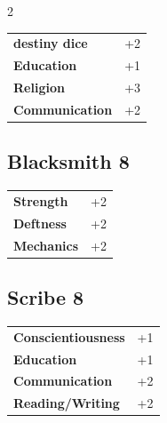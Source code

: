 \begin{multicols}{2}
\begin{tcolorbox}
\vspace{3mm}

\begin{tabular}{@{}ll@{}}
    \textbf{destiny dice} & +2\\
    \textbf{Education} & +1\\
    \textbf{Religion} & +3\\
    \textbf{Communication} & +2\\
\end{tabular}


\end{tcolorbox}

\begin{tcolorbox}
    \subsection*{Blacksmith \hfill \small{8 }}
    \tcblower




\begin{tabular}{@{}ll@{}}
    \textbf{Strength} & +2\\
    \textbf{Deftness} & +2\\
    \textbf{Mechanics} & +2\\
\end{tabular}


\end{tcolorbox}

\begin{tcolorbox}
    \subsection*{Scribe \hfill \small{8 }}
    \tcblower




\begin{tabular}{@{}ll@{}}
    \textbf{Conscientiousness} & +1\\
    \textbf{Education} & +1\\
    \textbf{Communication} & +2\\
    \textbf{Reading/Writing} & +2\\
\end{tabular}


\end{tcolorbox}
\end{multicols}
